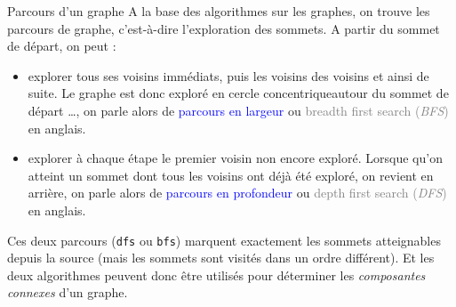 \documentclass[10pt]{beamer}
\begin{document}
\begin{frame}[fragile]{\Ctitle}{\stitle}
	\begin{block}{Parcours d'un graphe}
		A la base des algorithmes sur les graphes, on trouve les parcours de graphe, c'est-à-dire l'exploration des sommets. A partir du sommet de départ, on peut :
		\begin{itemize}
			\item<2-> explorer tous ses voisins immédiats, puis les voisins des voisins et ainsi de suite. Le graphe est donc exploré en \og cercle concentrique\fg autour du sommet de départ  \dots, on parle alors de  \textcolor{blue}{parcours en largeur} ou \textcolor{gray}{breadth first search (\textit{BFS})} en anglais.
			\item<3-> explorer à chaque étape le premier voisin non encore exploré. Lorsque qu'on atteint un sommet dont tous les voisins ont déjà été exploré, on revient en arrière, on parle alors de  \textcolor{blue}{parcours en profondeur} ou \textcolor{gray}{depth first search (\textit{DFS})} en anglais.
		\end{itemize}
		Ces deux parcours ({\tt dfs} ou {\tt bfs}) marquent exactement les sommets atteignables depuis la source (mais les sommets sont visités dans un ordre différent). Et les deux algorithmes peuvent donc être utilisés pour déterminer les \textit{composantes connexes} d'un graphe.
	\end{block}
\end{frame}
\end{document}

